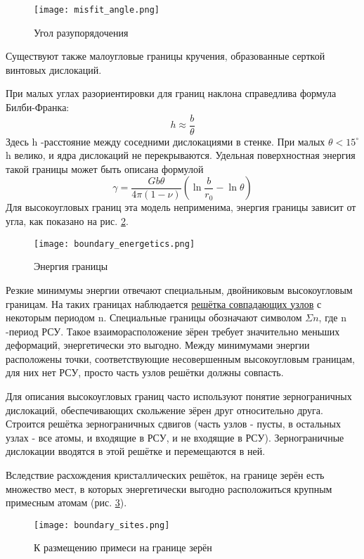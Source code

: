 \begin{figure}[h!]
\centering
\texttt{[image: misfit\_angle.png]}\caption{Угол разупорядочения} \label{fig:misfit_angle}
\end{figure} 
Существуют также малоугловые границы кручения, образованные серткой винтовых дислокаций. 
\par
При малых углах разориентировки для границ наклона справедлива формула Билби-Франка:
\begin{equation}
 h \approx \frac{b}{\theta}
\label{eq:Bilbi-Frank} 
\end{equation}
Здесь h -расстояние между соседними дислокациями в стенке. При малых $\theta < 15^\circ$ h велико, и ядра дислокаций не перекрываются. Удельная поверхностная энергия такой границы может быть описана формулой 
\begin{equation}
\gamma = \frac{Gb\theta}{4\pi (1-\nu)} \left(\ln \frac{b}{r_0} - \ln \theta \right)
\label{eq:boundary_energetics} 
\end{equation}
Для высокоугловых границ эта модель неприменима, энергия границы зависит от угла, как показано на рис. \ref{fig:boundary_energetics}.
\begin{figure}[h!]
\centering
\texttt{[image: boundary\_energetics.png]}\caption{Энергия границы} \label{fig:boundary_energetics}
\end{figure} 
Резкие минимумы энергии отвечают специальным, двойниковым высокоугловым границам. На таких границах наблюдается \underline{решётка совпадающих узлов} с некоторым периодом n. Специальные границы обозначают символом $\Sigma n$, где n -период РСУ. Такое взаиморасположение зёрен требует значительно меньших деформаций, энергетически это выгодно. Между минимумами энергии расположены точки, соответствующие несовершенным высокоугловым границам, для них нет РСУ, просто часть узлов решётки должны совпасть. 
\par
Для описания высокоугловых границ часто используют понятие зернограничных дислокаций, обеспечивающих скольжение зёрен друг относительно друга. Строится решётка зернограничных сдвигов (часть узлов - пусты, в остальных узлах - все атомы, и входящие в РСУ, и не входящие в РСУ). Зернограничные дислокации вводятся в этой решётке и перемещаются в ней. 
\par Вследствие расхождения кристаллических решёток, на границе зерён есть множество мест, в которых энергетически выгодно расположиться крупным примесным атомам (рис. \ref{fig:boundary_sites}).
\begin{figure}[h!]
\centering
\texttt{[image: boundary\_sites.png]}\caption{К размещению примеси на границе зерён} \label{fig:boundary_sites}
\end{figure} 

